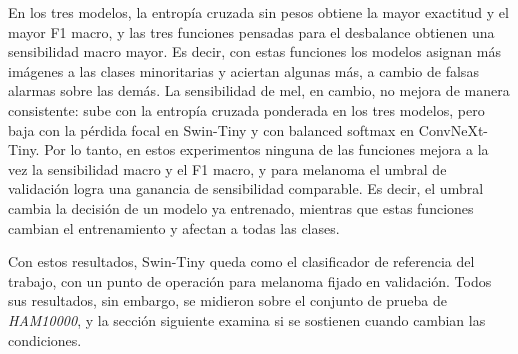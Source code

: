 En los tres modelos, la entropía cruzada sin pesos obtiene la mayor exactitud y el mayor F1 macro, y las tres funciones
pensadas para el desbalance obtienen una sensibilidad macro mayor. Es decir, con estas funciones los modelos asignan
más imágenes a las clases minoritarias y aciertan algunas más, a cambio de falsas alarmas sobre las demás. La
sensibilidad de \gls{mel}, en cambio, no mejora de manera consistente: sube con la entropía cruzada ponderada en los
tres modelos, pero baja con la pérdida focal en Swin-Tiny y con balanced softmax en ConvNeXt-Tiny. Por lo tanto, en
estos experimentos ninguna de las funciones mejora a la vez la sensibilidad macro y el F1 macro, y para melanoma el umbral de validación logra una ganancia de sensibilidad comparable. Es decir, el umbral cambia la
decisión de un modelo ya entrenado, mientras que estas funciones cambian el entrenamiento y afectan a todas las clases.

Con estos resultados, Swin-Tiny queda como el clasificador de referencia del trabajo, con un punto de operación para
melanoma fijado en validación. Todos sus resultados, sin embargo, se midieron sobre el conjunto de prueba de \emph{HAM10000}, y la
sección siguiente examina si se sostienen cuando cambian las condiciones.
